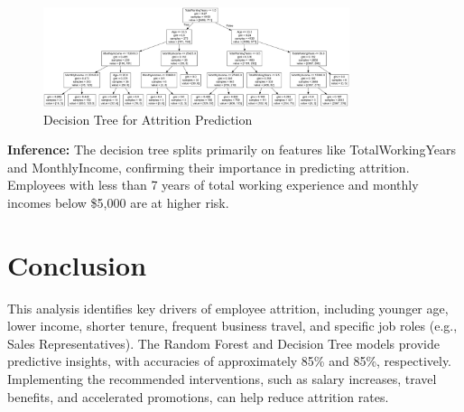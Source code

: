 \documentclass[12pt, a4paper]{article}
\begin{document}
\begin{figure}[H]
    \centering
    \includegraphics[width=0.8\textwidth]{plots/graphviz (1).png}
    \caption{Decision Tree for Attrition Prediction}
    \label{fig:decision_tree}
\end{figure}

\textbf{Inference:} The decision tree splits primarily on features like TotalWorkingYears and MonthlyIncome, confirming their importance in predicting attrition. Employees with less than 7 years of total working experience and monthly incomes below \$5,000 are at higher risk.

\section{Conclusion}
This analysis identifies key drivers of employee attrition, including younger age, lower income, shorter tenure, frequent business travel, and specific job roles (e.g., Sales Representatives). The Random Forest and Decision Tree models provide predictive insights, with accuracies of approximately 85\% and 85\%, respectively. Implementing the recommended interventions, such as salary increases, travel benefits, and accelerated promotions, can help reduce attrition rates.
\end{document}
